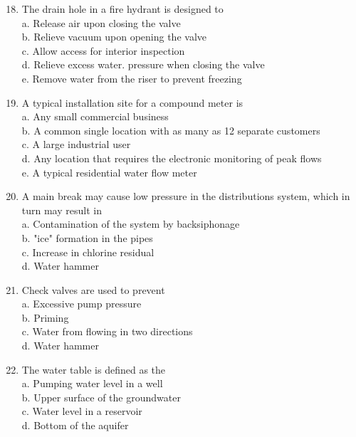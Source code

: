 \documentclass[10pt]{article}
\begin{document}
\begin{enumerate}
\begin{enumerate}
\begin{enumerate}
  \setcounter{enumi}{17}
  \item The drain hole in a fire hydrant is designed to\\
a. Release air upon closing the valve\\
b. Relieve vacuum upon opening the valve\\
c. Allow access for interior inspection\\
d. Relieve excess water. pressure when closing the valve\\
e. Remove water from the riser to prevent freezing\\

  \item A typical installation site for a compound meter is\\
a. Any small commercial business\\
b. A common single location with as many as 12 separate customers\\
c. A large industrial user\\
d. Any location that requires the electronic monitoring of peak flows\\
e. A typical residential water flow meter

  \item A main break may cause low pressure in the distributions system, which in turn may result in\\
a. Contamination of the system by backsiphonage\\
b. "ice" formation in the pipes\\
c. Increase in chlorine residual\\
d. Water hammer\\

  \item Check valves are used to prevent\\
a. Excessive pump pressure\\
b. Priming\\
c. Water from flowing in two directions\\
d. Water hammer\\

  \item The water table is defined as the\\
a. Pumping water level in a well\\
b. Upper surface of the groundwater\\
c. Water level in a reservoir\\
d. Bottom of the aquifer\\


\end{enumerate}
\end{enumerate}
\end{enumerate}
\end{document}
